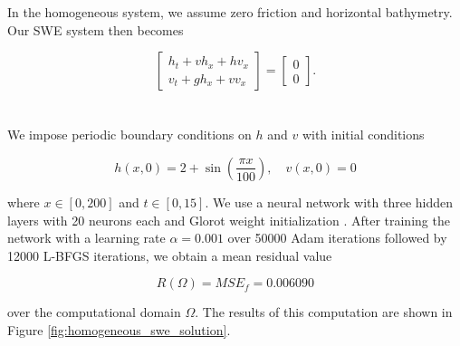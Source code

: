 In the homogeneous system, we assume zero friction and horizontal bathymetry. Our SWE system then becomes

$$
\renewcommand*{\arraystretch}{1.5}\begin{bmatrix}
    
    h_t + v h_x + h v_x \\
    v_t + g h_x + v v_x
\end{bmatrix} = \begin{bmatrix}
    0 \\
    0
\end{bmatrix}.
$$
\ \\\\
\noindent We impose periodic boundary conditions on $h$ and $v$ with initial conditions

$$
h(x, 0) = 2 + \sin{\left( \frac{\pi x}{100} \right)}, \quad v(x, 0) = 0
$$

\noindent where $x \in [0, 200]$ and $t \in [0, 15]$. We use a neural network with three hidden layers with 20 neurons 
each and Glorot weight initialization \cite{glorot2010understanding}. After training the network with a learning rate
$\alpha = 0.001$ over 50000 Adam iterations followed by 12000 L-BFGS iterations, we obtain a mean residual value

$$
R(\Omega) = MSE_f = 0.006090
$$

\noindent over the computational domain $\Omega$. The results of this computation are shown 
in Figure \ref{fig:homogeneous_swe_solution}.

